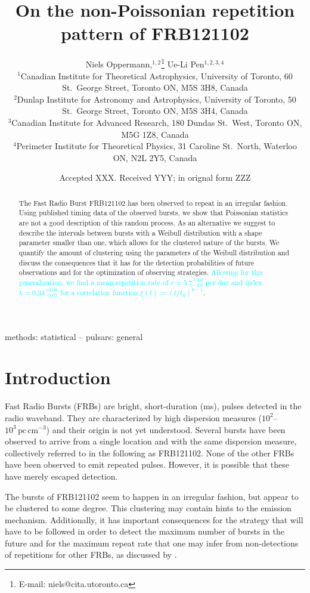 \documentclass[fleqn,usenatbib]{mnras}
\title{On the non-Poissonian repetition pattern of FRB121102}
\author[N. Oppermann et al.]{Niels Oppermann,$^{1,2}$\thanks{E-mail: niels@cita.utoronto.ca}
Ue-Li Pen$^{1,2,3,4}$
\\
$^{1}$Canadian Institute for Theoretical Astrophysics, University of Toronto, 60 St.\ George Street, Toronto ON, M5S 3H8, Canada\\
$^{2}$Dunlap Institute for Astronomy and Astrophysics, University of Toronto, 50 St.\ George Street, Toronto ON, M5S 3H4, Canada\\
$^{3}$Canadian Institute for Advanced Research, 180 Dundas St.\ West, Toronto ON, M5G 1Z8, Canada\\
$^{4}$Perimeter Institute for Theoretical Physics, 31 Caroline St.\ North, Waterloo ON, N2L 2Y5, Canada
}
\date{Accepted XXX. Received YYY; in orignal form ZZZ}
\newcommand{\new}[1]{\textcolor{cyan}{#1}}
\begin{document}
\label{firstpage}
\pagerange{\pageref{firstpage}--\pageref{lastpage}}
\maketitle

\begin{abstract}
	The Fast Radio Burst FRB121102 has been observed to repeat in an irregular fashion. Using published timing data of the observed bursts, we show that Poissonian statistics are not a good description of this random process. As an alternative we suggest to describe the intervals between bursts with a Weibull distribution with a shape parameter smaller than one, which allows for the clustered nature of the bursts. We quantify the amount of clustering using the parameters of the Weibull distribution and discuss the consequences that it has for the detection probabilities of future observations and for the optimization of observing strategies. \new{Allowing for this generalization, we find a mean repetition rate of $r=5.7^{+3.0}_{-2.0}$ per day and index $k=0.34^{+0.06}_{-0.05}$ for a correlation function $\xi(t)=(t/t_0)^{k-1}$}.
\end{abstract}

\begin{keywords}
methods: statistical -- pulsars: general
\end{keywords}


\section{Introduction}
\label{sec:introduction}

Fast Radio Bursts (FRBs) are bright, short-duration (ms), pulses detected in the radio waveband. They are characterized by high dispersion measures ($10^2$--$10^3\,\mathrm{pc}\,\mathrm{cm}^{-3}$) and their origin is not yet understood. Several bursts have been observed to arrive from a single location and with the same dispersion measure, collectively referred to in the following as FRB121102. None of the other FRBs have been observed to emit repeated pulses. However, it is possible that these have merely escaped detection.

The bursts of FRB121102 seem to happen in an irregular fashion, but appear to be clustered to some degree. This clustering may contain hints to the emission mechanism. Additionally, it has important consequences for the strategy that will have to be followed in order to detect the maximum number of bursts in the future and for the maximum repeat rate that one may infer from non-detections of repetitions for other FRBs, as discussed by \citet{connor-2016}.
\end{document}
